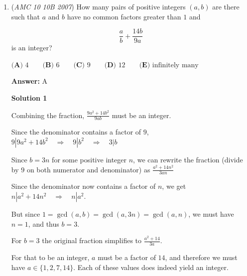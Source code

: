 \begin{enumerate}
 \textbf{Answer: }C



\textbf{Solution}

For a number to be divisible by $4,$ the last two digits have to be divisible by $4.$ That means the last two digits of this integer must be $4.$

 For a number to be divisible by $9,$ the sum of all the digits must be divisible by $9.$ The way to make this happen most efficiently is with nine $4$'s - if we add nines, we preserve the residue of the sum modulo $9$. However, we also need one $9.$

 The smallest integer that meets all these conditions is $4444444944$. The last four digits are $\boxed{\mathrm{(C) \ } 4944}$

 Note: the problem where this is linked is covered 1:00-2:30

 


	\item (\textit{AMC 10 10B 2007}) How many pairs of positive integers $(a,b)$ are there such that $a$ and $b$ have no common factors greater than $1$ and

 \[\frac{a}{b} + \frac{14b}{9a}\]
is an integer?


 $\textbf{(A) } 4 \qquad\textbf{(B) } 6 \qquad\textbf{(C) } 9 \qquad\textbf{(D) } 12 \qquad\textbf{(E) } \text{infinitely many}$

 \textbf{Answer: }A



\textbf{Solution 1}

Combining the fraction, $\frac{9a^2 + 14b^2}{9ab}$ must be an integer.

 Since the denominator contains a factor of $9$, $9 | 9a^2 + 14b^2 \quad\Longrightarrow\quad 9 | b^2 \quad\Longrightarrow\quad 3 | b$

 Since $b = 3n$ for some positive integer $n$, we can rewrite the fraction (divide by $9$ on both numerator and denominator) as $\frac{a^2 + 14n^2}{3an}$

 Since the denominator now contains a factor of $n$, we get $n | a^2 + 14n^2 \quad\Longrightarrow\quad n | a^2$.

 But since $1=\gcd(a,b)=\gcd(a,3n)=\gcd(a,n)$, we must have $n=1$, and thus $b=3$.

 For $b=3$ the original fraction simplifies to $\frac{a^2 + 14}{3a}$.

 For that to be an integer, $a$ must be a factor of $14$, and therefore we must have $a\in\{1,2,7,14\}$. Each of these values does indeed yield an integer.


\end{enumerate}
